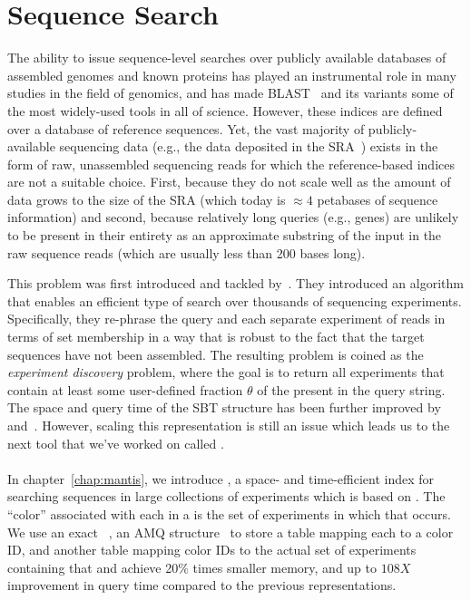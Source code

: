 \section{Sequence Search}
\label{subsec:seqsearch}
The ability to issue sequence-level searches over publicly available databases
of assembled genomes and known proteins has played an instrumental role in many
studies in the field of genomics, and has made BLAST~\citep{Altschul1990BLAST}
and its variants some of the most widely-used tools in all of science.
However, these indices are defined over a database of reference sequences.
Yet, the vast majority of
publicly-available sequencing data (e.g., the data deposited in the
SRA~\citep{Kodama2011sequence}) exists in the form of raw, unassembled
sequencing reads for which the reference-based indices are not
a suitable choice. First, because they do not
scale well as the amount of data grows to the size of the  SRA (which today is
$\approx 4$ petabases of sequence information) and second, because relatively long queries (e.g.,
genes) are unlikely to be present in their entirety as an approximate substring
of the input in the raw sequence reads (which are usually less than 200 bases long).

This problem was first introduced and tackled by~\citet{Solomon2016Fast}.
They introduced an algorithm that enables an
efficient type of search over thousands of sequencing experiments.
Specifically, they re-phrase the query and each separate experiment of reads
in terms of \kmer set membership in a way
that is robust to the fact that the target sequences have not been assembled.
The resulting problem is coined as the \emph{experiment discovery} problem,
where the goal is to return all experiments that contain at least some
user-defined fraction $\theta$ of the \kmers present in the query string.
The space and query time of the SBT structure has been further improved
by~\cite{Solomon2017Improved} and~\cite{Sun2017Allsome}.
However, scaling this representation is still an issue
which leads us to the next tool that we've worked on called \mantis.

\paragraph*{}
In chapter~\ref{chap:mantis}, we introduce \mantis,
a space- and time-efficient index for searching sequences in large
collections of experiments which is based on \cdbgs.
The ``color'' associated with each \kmer
in a \cdbg is the set of experiments in which that \kmer occurs. We
use an exact \cqf~\cite{PandeyBeJo17a}, an AMQ structure~\cite{}
to store a table mapping each \kmer to a color ID,
and another table mapping color IDs to the actual set of experiments
containing that \kmer and achieve 20$\%$ times smaller memory,
and up to $108X$ improvement in query time compared to the previous representations.

